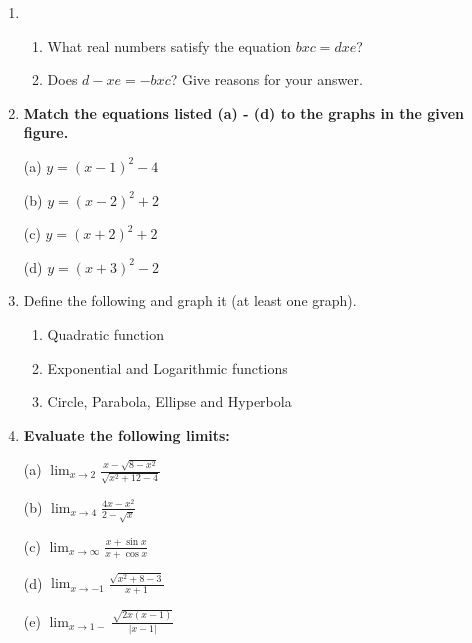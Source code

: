 \documentclass{article}
\begin{document}
\begin{enumerate}
(b) $g(x) = 
\begin{cases}
\frac{1}{x} & x < 0 \\
x & 0 \leq x
\end{cases}$

\item\begin{enumerate}
\item What real numbers satisfy the equation $bxc = dxe$?
\item Does $d - xe = -bxc$? Give reasons for your answer.
\end{enumerate}
\item \textbf{Match the equations listed (a) - (d) to the graphs in the given figure.}

(a) $y = (x - 1)^2 - 4$

(b) $y = (x - 2)^2 + 2$

(c) $y = (x + 2)^2 + 2$

(d) $y = (x + 3)^2 - 2$

\begin{figure}
\end{figure}


\item Define the following and graph it (at least one graph).
\begin{enumerate}
\item Quadratic function
\item Exponential and Logarithmic functions
\item Circle, Parabola, Ellipse and Hyperbola
\end{enumerate}

\item \textbf{Evaluate the following limits:}

(a) $\lim_{x \to 2} \frac{x - \sqrt{8 - x^2}}{\sqrt{x^2 + 12 - 4}}$

(b) $\lim_{x \to 4} \frac{4x - x^2}{2 - \sqrt{x}}$

(c) $\lim_{x \to \infty} \frac{x + \sin x}{x + \cos x}$

(d) $\lim_{x \to -1} \frac{\sqrt{x^2 + 8 - 3}}{x + 1}$

(e) $\lim_{x \to 1-} \frac{\sqrt{2x(x - 1)}}{|x - 1|}$


\end{enumerate}
\end{document}
